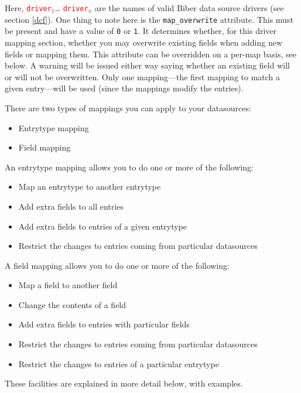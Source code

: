\documentclass{ltxdockit}
\begin{document}
\noindent Here, \textcolor{red}{\texttt{driver$_1$}}\ldots
\textcolor{red}{\texttt{driver$_n$}} are the names of valid Biber data
source drivers (see section \ref{dcf}). One thing to note here is the
\verb+map_overwrite+ attribute. This must be present and have a value of
\verb+0+ or \verb+1+. It determines whether, for this driver mapping
section, whether you may overwrite existing fields when adding new fields
or mapping them. This attribute can be overridden on a per-map basis, see
below. A warning will be issued either way saying whether an existing field
will or will not be overwritten. Only one mapping---the first mapping to
match a given entry---will be used (since the mappings modify the entries).

There are two types of mappings you can apply to your datasources:

\begin{itemize}
\item Entrytype mapping
\item Field mapping
\end{itemize}

\noindent An entrytype mapping allows you to do one or more of the
following:

\begin{itemize}
\item Map an entrytype to another entrytype
\item Add extra fields to all entries
\item Add extra fields to entries of a given entrytype
\item Restrict the changes to entries coming from particular datasources
\end{itemize}

\noindent A field mapping allows you to do one or more of the
following:

\begin{itemize}
\item Map a field to another field
\item Change the contents of a field
\item Add extra fields to entries with particular fields
\item Restrict the changes to entries coming from particular
  datasources
\item Restrict the changes to entries of a particular entrytype
\end{itemize}

\noindent These facilities are explained in more detail below, with examples.
\end{document}
